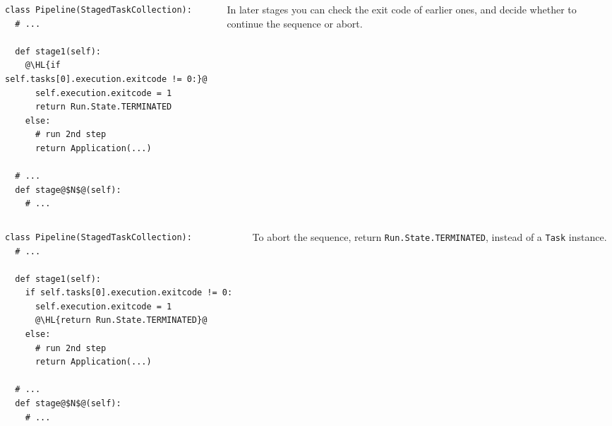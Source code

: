 \documentclass[english,serif,mathserif,xcolor=pdftex,dvipsnames,table]{beamer}
\begin{document}
\begin{frame}[fragile]
  \begin{columns}[c]
    \begin{column}{0.6\textwidth}
      \begin{lstlisting}
class Pipeline(StagedTaskCollection):
  # ...

  def stage1(self):
    @\HL{if self.tasks[0].execution.exitcode != 0:}@
      self.execution.exitcode = 1
      return Run.State.TERMINATED
    else:
      # run 2nd step
      return Application(...)

  # ...
  def stage@$N$@(self):
    # ...
      \end{lstlisting}
    \end{column}
    \begin{column}{0.4\textwidth}
      \raggedleft

      \+\+\+\+\+ 
      In later stages you can check the exit code of
      earlier ones, and decide whether to continue the sequence or
      abort.
    \end{column}
  \end{columns}
\end{frame}


\begin{frame}[fragile]
  \begin{columns}[c]
    \begin{column}{0.6\textwidth}
      \begin{lstlisting}
class Pipeline(StagedTaskCollection):
  # ...

  def stage1(self):
    if self.tasks[0].execution.exitcode != 0:
      self.execution.exitcode = 1
      @\HL{return Run.State.TERMINATED}@
    else:
      # run 2nd step
      return Application(...)

  # ...
  def stage@$N$@(self):
    # ...
      \end{lstlisting}
    \end{column}
    \begin{column}{0.4\textwidth}
      \raggedleft

      \+\+\+\+\+
      To abort the sequence, return \texttt{Run.State.TERMINATED},
      instead of a \texttt{Task} instance.
    \end{column}
  \end{columns}
\end{frame}
\end{document}
